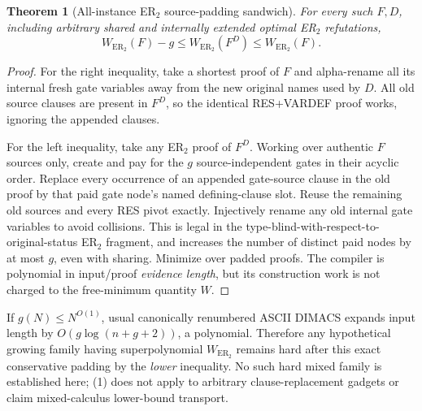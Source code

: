 \documentclass[11pt]{article}
\newtheorem{theorem}{Theorem}
\begin{document}
\begin{theorem}[All-instance ER$_2$ source-padding sandwich]
For every such $F,D$, including arbitrary shared and internally extended optimal ER$_2$ refutations,
\[
\boxed{W_{\mathrm{ER}_2}(F)-g\le W_{\mathrm{ER}_2}(F^D)\le W_{\mathrm{ER}_2}(F).}\tag{1}
\]
\end{theorem}
\begin{proof}
For the right inequality, take a shortest proof of $F$ and alpha-rename all its internal fresh gate variables away from the new original names used by $D$. All old source clauses are present in $F^D$, so the identical RES+VARDEF proof works, ignoring the appended clauses.

For the left inequality, take any ER$_2$ proof of $F^D$. Working over authentic $F$ sources only, create and pay for the $g$ source-independent gates in their acyclic order. Replace every occurrence of an appended gate-source clause in the old proof by that paid gate node's named defining-clause slot. Reuse the remaining old sources and every RES pivot exactly. Injectively rename any old internal gate variables to avoid collisions. This is legal in the type-blind-with-respect-to-original-status ER$_2$ fragment, and increases the number of distinct paid nodes by at most $g$, even with sharing. Minimize over padded proofs. The compiler is polynomial in input/proof \emph{evidence length}, but its construction work is not charged to the free-minimum quantity $W$. \end{proof}

If $g(N)\le N^{O(1)}$, usual canonically renumbered ASCII DIMACS expands input length by $O(g\log(n+g+2))$, a polynomial. Therefore any hypothetical growing family having superpolynomial $W_{\mathrm{ER}_2}$ remains hard after this exact conservative padding by the \emph{lower} inequality. No such hard mixed family is established here; (1) does not apply to arbitrary clause-replacement gadgets or claim mixed-calculus lower-bound transport.
\end{document}
